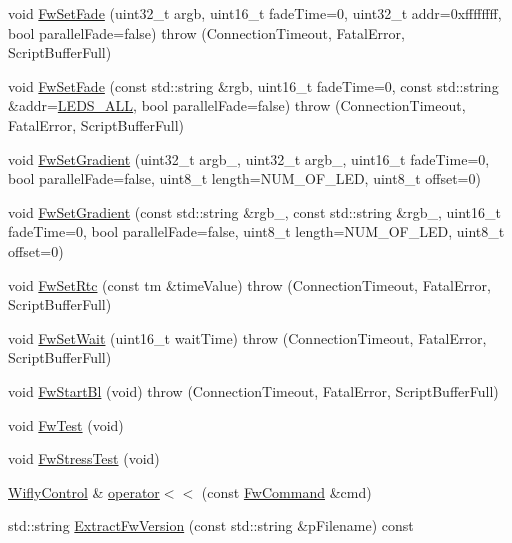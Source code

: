\begin{DoxyCompactItemize}
\item 
void \hyperlink{class_wifly_control_a77eb0c39bd03d4c53454bc073b4c7222}{Fw\-Set\-Fade} (uint32\-\_\-t argb, uint16\-\_\-t fade\-Time=0, uint32\-\_\-t addr=0xffffffff, bool parallel\-Fade=false)  throw (\-Connection\-Timeout, Fatal\-Error, Script\-Buffer\-Full)
\item 
void \hyperlink{class_wifly_control_aec3836ab96ed383e0b71fd83c6ffacec}{Fw\-Set\-Fade} (const std\-::string \&rgb, uint16\-\_\-t fade\-Time=0, const std\-::string \&addr=\hyperlink{class_wifly_control_a1fb5f6703533d3ccf68f6e474f51dbce}{L\-E\-D\-S\-\_\-\-A\-L\-L}, bool parallel\-Fade=false)  throw (\-Connection\-Timeout, Fatal\-Error, Script\-Buffer\-Full)
\item 
void \hyperlink{class_wifly_control_ae5429affd4ec390e98a83285ffc6e47f}{Fw\-Set\-Gradient} (uint32\-\_\-t argb\-\_, uint32\-\_\-t argb\-\_, uint16\-\_\-t fade\-Time=0, bool parallel\-Fade=false, uint8\-\_\-t length=N\-U\-M\-\_\-\-O\-F\-\_\-\-L\-E\-D, uint8\-\_\-t offset=0)
\item 
void \hyperlink{class_wifly_control_afbbba00d0ca2d1f89f8c07a646772b5f}{Fw\-Set\-Gradient} (const std\-::string \&rgb\-\_, const std\-::string \&rgb\-\_, uint16\-\_\-t fade\-Time=0, bool parallel\-Fade=false, uint8\-\_\-t length=N\-U\-M\-\_\-\-O\-F\-\_\-\-L\-E\-D, uint8\-\_\-t offset=0)
\item 
void \hyperlink{class_wifly_control_afa33dda7cca4297bd549e2b34c22460e}{Fw\-Set\-Rtc} (const tm \&time\-Value)  throw (\-Connection\-Timeout, Fatal\-Error, Script\-Buffer\-Full)
\item 
void \hyperlink{class_wifly_control_aa3ba28e663ea4ca129314ea132daabba}{Fw\-Set\-Wait} (uint16\-\_\-t wait\-Time)  throw (\-Connection\-Timeout, Fatal\-Error, Script\-Buffer\-Full)
\item 
void \hyperlink{class_wifly_control_af0c5eab4aec08916450234231ff56e23}{Fw\-Start\-Bl} (void)  throw (\-Connection\-Timeout, Fatal\-Error, Script\-Buffer\-Full)
\item 
void \hyperlink{class_wifly_control_ab7163d265422cb49fefc935da9e2857c}{Fw\-Test} (void)
\item 
void \hyperlink{class_wifly_control_aa954fdf2ebcf00d628fc80231c2c4197}{Fw\-Stress\-Test} (void)
\item 
\hyperlink{class_wifly_control}{Wifly\-Control} \& \hyperlink{class_wifly_control_ad15afdd61f031ca77c4807fbb3869f95}{operator$<$$<$} (const \hyperlink{class_fw_command}{Fw\-Command} \&cmd)
\item 
std\-::string \hyperlink{class_wifly_control_a5ce19529396544bd081d1b00df62b794}{Extract\-Fw\-Version} (const std\-::string \&p\-Filename) const 
\end{DoxyCompactItemize}

